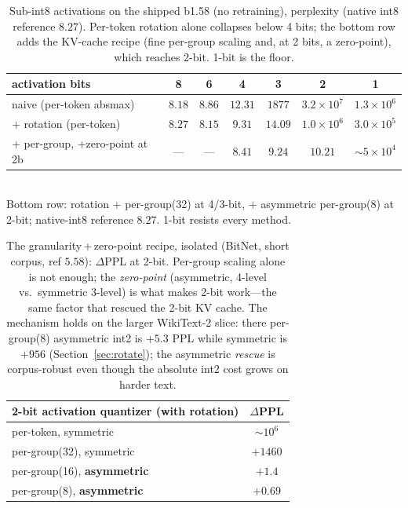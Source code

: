 \documentclass[11pt]{article}
\begin{document}
\begin{table}[t]\centering\small
\caption{Sub-int8 activations on the shipped b1.58 (no retraining), perplexity
(native int8 reference $8.27$). Per-token rotation alone collapses below 4 bits;
the bottom row adds the KV-cache recipe (fine per-group scaling and, at 2 bits, a
zero-point), which reaches 2-bit. 1-bit is the floor.}
\label{tab:actbits}
\begin{tabular}{lcccccc}
\toprule
activation bits & 8 & 6 & 4 & 3 & 2 & 1\\
\midrule
naive (per-token absmax)     & $8.18$ & $8.86$ & $12.31$ & $1877$ & $3.2{\times}10^7$ & $1.3{\times}10^6$\\
\;+ rotation (per-token)     & $8.27$ & $8.15$ & $9.31$  & $14.09$& $1.0{\times}10^6$ & $3.0{\times}10^5$\\
\;+ per-group, +zero-point at 2b & --- & --- & $\mathbf{8.41}$ & $\mathbf{9.24}$ & $\mathbf{10.21}$ & $\sim\!5{\times}10^4$\\
\bottomrule
\end{tabular}
\\[2pt]{\footnotesize Bottom row: rotation + per-group(32) at 4/3-bit, + asymmetric
per-group(8) at 2-bit; native-int8 reference $8.27$. 1-bit resists every method.}
\end{table}

\begin{table}[t]\centering\small
\caption{The granularity\,+\,zero-point recipe, isolated (BitNet, short corpus, ref
$5.58$): $\Delta$PPL at 2-bit. Per-group scaling alone is not enough; the
\emph{zero-point} (asymmetric, 4-level vs.\ symmetric 3-level) is what makes 2-bit
work---the same factor that rescued the 2-bit KV cache. The mechanism holds on the
larger WikiText-2 slice: there per-group(8) asymmetric int2 is $+5.3$ PPL while
symmetric is $+956$ (Section~\ref{sec:rotate}); the asymmetric \emph{rescue} is
corpus-robust even though the absolute int2 cost grows on harder text.}
\label{tab:lowbit}
\begin{tabular}{lc}
\toprule
2-bit activation quantizer (with rotation) & $\Delta$PPL\\
\midrule
per-token, symmetric & $\sim\!10^6$\\
per-group(32), symmetric & $+1460$\\
per-group(16), \textbf{asymmetric} & $+1.4$\\
per-group(8), \textbf{asymmetric} & $\mathbf{+0.69}$\\
\bottomrule
\end{tabular}
\end{table}
\end{document}
